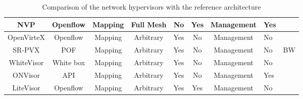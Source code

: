 \begin{table}[]
{\begin{tabular}{|c|c|c|c|c|c|c|l|c|}
NVP                      & Openflow                  & Mapping       & Full Mesh     & No  & Yes & Management & Yes      &                    \\ \hline
OpenVirteX               & Openflow                  & Mapping       & Arbitrary     & Yes & No  & Management & No       &                    \\ \hline
SR-PVX                   & POF                       & Mapping       & Arbitrary     & Yes & No  & Management & No       & BW                 \\ \hline
WhiteVisor               & White box                 & Mapping       & Arbitrary     & Yes & No  & Management & No       &                    \\ \hline
ONVisor                  & API                       & Mapping       & Arbitrary     & Yes & No  & Management & Yes      &                    \\ \hline
LiteVisor                & Openflow                  & Mapping       & Arbitrary     & Yes & Yes & Management & No       &                    \\ \hline
\end{tabular}%
}
\caption{Comparison of the network hypervisors with the reference architecture}
\label{tab:comparison-refarchi}
\end{table}